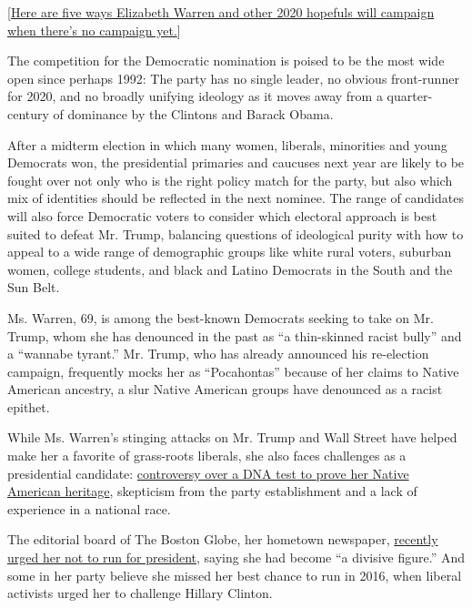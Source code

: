 {[}\href{https://www.nytimes3xbfgragh.onion/2019/01/02/us/politics/elizabeth-warren-2020-candidates.html}{Here
are five ways Elizabeth Warren and other 2020 hopefuls will campaign
when there's no campaign yet.}{]}

The competition for the Democratic nomination is poised to be the most
wide open since perhaps 1992: The party has no single leader, no obvious
front-runner for 2020, and no broadly unifying ideology as it moves away
from a quarter-century of dominance by the Clintons and Barack Obama.

After a midterm election in which many women, liberals, minorities and
young Democrats won, the presidential primaries and caucuses next year
are likely to be fought over not only who is the right policy match for
the party, but also which mix of identities should be reflected in the
next nominee. The range of candidates will also force Democratic voters
to consider which electoral approach is best suited to defeat Mr. Trump,
balancing questions of ideological purity with how to appeal to a wide
range of demographic groups like white rural voters, suburban women,
college students, and black and Latino Democrats in the South and the
Sun Belt.

Ms. Warren, 69, is among the best-known Democrats seeking to take on Mr.
Trump, whom she has denounced in the past as ``a thin-skinned racist
bully'' and a ``wannabe tyrant.'' Mr. Trump, who has already announced
his re-election campaign, frequently mocks her as ``Pocahontas'' because
of her claims to Native American ancestry, a slur Native American groups
have denounced as a racist epithet.

While Ms. Warren's stinging attacks on Mr. Trump and Wall Street have
helped make her a favorite of grass-roots liberals, she also faces
challenges as a presidential candidate:
\href{https://www.nytimes3xbfgragh.onion/2018/12/06/us/politics/elizabeth-warren-dna-test-2020.html}{controversy
over a DNA test to prove her Native American heritage}, skepticism from
the party establishment and a lack of experience in a national race.

The editorial board of The Boston Globe, her hometown newspaper,
\href{https://www.bostonglobe.com/opinion/editorials/2018/12/07/deval-patrick-knew-when-call-quits-presidential-bid-other-political-figures-should-take-note/nOLcrzE5xTQgfXpPMKrUZM/story.html}{recently
urged her not to run for president}, saying she had become ``a divisive
figure.'' And some in her party believe she missed her best chance to
run in 2016, when liberal activists urged her to challenge Hillary
Clinton.

